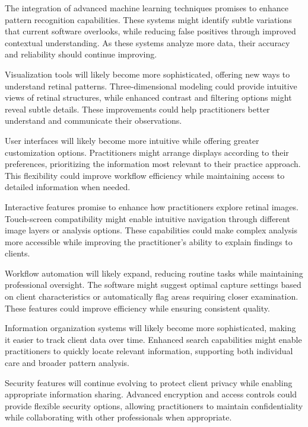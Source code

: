 \documentclass[
  Letterpaper,
]{scrbook}
\begin{document}
The integration of advanced machine learning techniques promises to
enhance pattern recognition capabilities. These systems might identify
subtle variations that current software overlooks, while reducing false
positives through improved contextual understanding. As these systems
analyze more data, their accuracy and reliability should continue
improving.

Visualization tools will likely become more sophisticated, offering new
ways to understand retinal patterns. Three-dimensional modeling could
provide intuitive views of retinal structures, while enhanced contrast
and filtering options might reveal subtle details. These improvements
could help practitioners better understand and communicate their
observations.

User interfaces will likely become more intuitive while offering greater
customization options. Practitioners might arrange displays according to
their preferences, prioritizing the information most relevant to their
practice approach. This flexibility could improve workflow efficiency
while maintaining access to detailed information when needed.

Interactive features promise to enhance how practitioners explore
retinal images. Touch-screen compatibility might enable intuitive
navigation through different image layers or analysis options. These
capabilities could make complex analysis more accessible while improving
the practitioner's ability to explain findings to clients.

Workflow automation will likely expand, reducing routine tasks while
maintaining professional oversight. The software might suggest optimal
capture settings based on client characteristics or automatically flag
areas requiring closer examination. These features could improve
efficiency while ensuring consistent quality.

Information organization systems will likely become more sophisticated,
making it easier to track client data over time. Enhanced search
capabilities might enable practitioners to quickly locate relevant
information, supporting both individual care and broader pattern
analysis.

Security features will continue evolving to protect client privacy while
enabling appropriate information sharing. Advanced encryption and access
controls could provide flexible security options, allowing practitioners
to maintain confidentiality while collaborating with other professionals
when appropriate.
\end{document}

